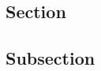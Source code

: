 \newpage
\pagestyle{empty}
\begin{appendices}

\section{Section}
\label{sec:appendices:section}

\subsection{Subsection}
\label{sec:appendices:section:subsection}

\end{appendices}
